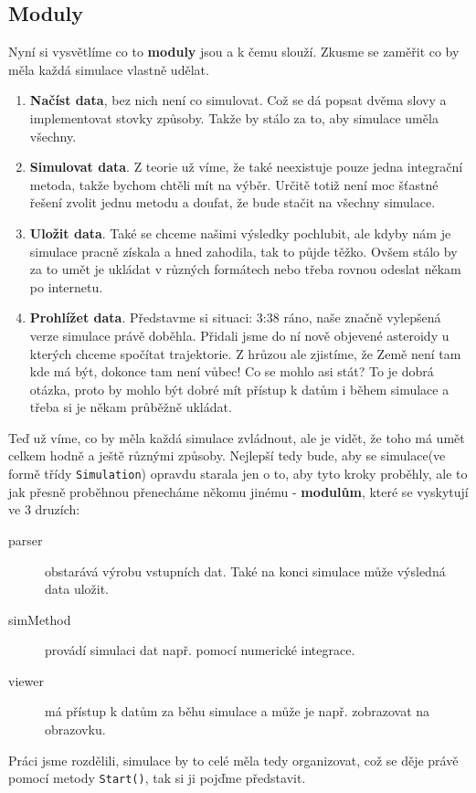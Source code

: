 \subsection{Moduly}
\label{sub:moduly}
Nyní si vysvětlíme co to \textbf{moduly} jsou a k čemu slouží.
Zkusme se zaměřit co by měla každá simulace vlastně udělat.
\begin{enumerate}
	\item \textbf{Načíst data}, bez nich není co simulovat. Což se dá popsat dvěma slovy a implementovat stovky způsoby. Takže by stálo za to, aby simulace uměla všechny.
	\item \textbf{Simulovat data}. Z teorie už víme, že také neexistuje pouze jedna integrační metoda, takže bychom chtěli mít na výběr. Určitě totiž není moc šťastné řešení zvolit jednu metodu a doufat, že bude stačit na všechny simulace.
	\item \textbf{Uložit data}. Také se chceme našimi výsledky pochlubit, ale kdyby nám je simulace pracně získala a hned zahodila, tak to půjde těžko. Ovšem stálo by za to umět je ukládat v různých formátech nebo třeba rovnou odeslat někam po internetu.
	\item \textbf{Prohlížet data}. Představme si situaci: 3:38 ráno, naše značně vylepšená verze simulace právě doběhla. Přidali jsme do ní nově objevené asteroidy u kterých chceme spočítat trajektorie. Z hrůzou ale zjistíme, že Země není tam kde má být, dokonce tam není vůbec! Co se mohlo asi stát? To je dobrá otázka, proto by mohlo být dobré mít přístup k datům i během simulace a třeba si je někam průběžně ukládat.
\end{enumerate}
Teď už víme, co by měla každá simulace zvládnout, ale je vidět, že toho má umět celkem hodně a ještě různými způsoby. Nejlepší tedy bude, aby se simulace(ve formě třídy \texttt{Simulation}) opravdu starala jen o to, aby tyto kroky proběhly, ale to jak přesně proběhnou přenecháme někomu jinému -\textbf{ modulům}, které se vyskytují ve 3 druzích:
\begin{description}
	\item[parser] obstarává výrobu vstupních dat. Také na konci simulace může výsledná data uložit.
	\item[simMethod] provádí simulaci dat např. pomocí numerické integrace.
	\item[viewer] má přístup k datům za běhu simulace a může je např. zobrazovat na obrazovku.
\end{description}
Práci jsme rozdělili, simulace by to celé měla tedy organizovat, což se děje právě pomocí metody \texttt{Start()}, tak si ji pojďme představit.
